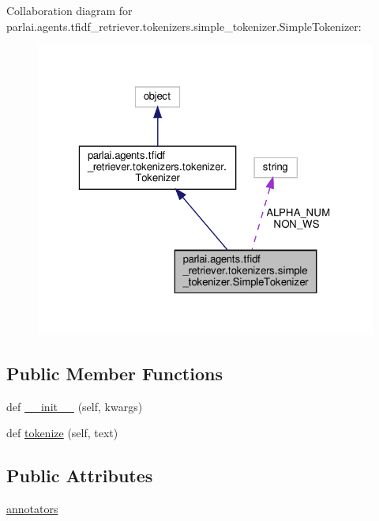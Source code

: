 Collaboration diagram for parlai.\+agents.\+tfidf\+\_\+retriever.\+tokenizers.\+simple\+\_\+tokenizer.\+Simple\+Tokenizer\+:
\nopagebreak
\begin{figure}[H]
\begin{center}
\leavevmode
\includegraphics[width=323pt]{dc/d4d/classparlai_1_1agents_1_1tfidf__retriever_1_1tokenizers_1_1simple__tokenizer_1_1SimpleTokenizer__coll__graph}
\end{center}
\end{figure}
\subsection*{Public Member Functions}
\begin{DoxyCompactItemize}
\item 
def \hyperlink{classparlai_1_1agents_1_1tfidf__retriever_1_1tokenizers_1_1simple__tokenizer_1_1SimpleTokenizer_a6a038fd66269e0a8e76e62260b13f4d9}{\+\_\+\+\_\+init\+\_\+\+\_\+} (self, kwargs)
\item 
def \hyperlink{classparlai_1_1agents_1_1tfidf__retriever_1_1tokenizers_1_1simple__tokenizer_1_1SimpleTokenizer_a690bc237be6349de5c3f105e0be37ea7}{tokenize} (self, text)
\end{DoxyCompactItemize}
\subsection*{Public Attributes}
\begin{DoxyCompactItemize}
\item 
\hyperlink{classparlai_1_1agents_1_1tfidf__retriever_1_1tokenizers_1_1simple__tokenizer_1_1SimpleTokenizer_aa2edbea9c08e8b1fbe5eef7d61e3f432}{annotators}
\end{DoxyCompactItemize}
